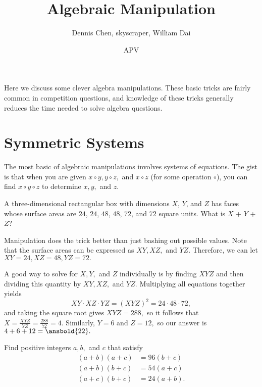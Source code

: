 \documentclass{article}
\title{Algebraic Manipulation}
\author{Dennis Chen, skyscraper, William Dai}
\date{APV}
\begin{document}
\maketitle

Here we discuss some clever algebra manipulations. These basic tricks are fairly common in competition questions, and knowledge of these tricks generally reduces the time needed to solve algebra questions.

\section{Symmetric Systems}

The most basic of algebraic manipulations involves systems of equations. The gist is that when you are given $x\circ y,y\circ z,$ and $x\circ z$ (for some operation $\circ$), you can find $x \circ y \circ z$ to determine $x,y,$ and $z.$
\begin{exam}[2018 AMC 10B/4]
A three-dimensional rectangular box with dimensions $X$, $Y$, and $Z$ has faces whose surface areas are $24$, $24$, $48$, $48$, $72$, and $72$ square units. What is $X$ + $Y$ + $Z$?
\end{exam}
\begin{sol}
Manipulation does the trick better than just bashing out possible values. Note that the surface areas can be expressed as $XY,XZ,$ and $YZ.$ Therefore, we can let $XY = 24, XZ = 48, YZ = 72.$

A good way to solve for $X,Y,$ and $Z$ individually is by finding $XYZ$ and then dividing this quantity by $XY, XZ,$ and $YZ.$ Multiplying all equations together yields
\[XY \cdot XZ \cdot YZ = (XYZ)^2 = 24 \cdot 48 \cdot 72,\]
and taking the square root gives $XYZ = 288,$ so it follows that $X = \frac{XYZ}{YZ} = \frac{288}{72} = 4.$ Similarly, $Y = 6$ and $Z=12,$ so our answer is $4+6+12=\ansbold{22}.$
\end{sol}
\begin{exam}[Classic]
Find positive integers $a,b,$ and $c$ that satisfy
\begin{align*}
(a+b)(a+c)&=96(b+c) \\
(a+b)(b+c)&=54(a+c) \\
(a+c)(b+c)&=24(a+b).
\end{align*}
\end{exam}
\end{document}

